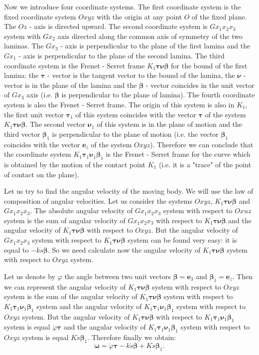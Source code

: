 \documentclass[10pt]{enoc2011}
\renewcommand{\vec}[1]{\boldsymbol{#1}}
\begin{document}
Now we introduce four coordinate systems. The first coordinate system is the fixed coordinate system $Oxyz$ with the origin at any point $O$ of the fixed plane. The $Oz$ - axis is directed upward. The second coordinate system is $Gx_1x_2x_3$ system with $Gx_2$ axis directed along the common axis of symmetry of the two laminas. The $Gx_3$ - axis  is perpendicular to the plane of the first lamina and the $Gx_1$ - axis is perpendicular to the plane of the second lamina. The third coordinate system is the Frenet - Serret frame $K_1\vec\tau\vec\nu\vec\beta$ for the bound of the first lamina: the $\vec\tau$ - vector is the tangent vector to the bound of the lamina, the $\vec\nu$ - vector is in the plane of the lamina and the $\vec\beta$ - vector coincides in the unit vector of $Gx_3$ axis (i.e. $\vec\beta$ is perpendicular to the plane of lamina). The fourth coordinate system is also the Frenet - Serret frame. The origin of this system is also in $K_1$, the first unit vector $\vec\tau_1$ of this system coincides with the vector $\vec\tau$ of the system $K_1\vec\tau\vec\nu\vec\beta$. The second vector $\vec\nu_1$ of this system is in the plane of motion and the third vector $\vec\beta_1$ is perpendicular to the plane of motion (i.e. the vector $\vec\beta_1$ coincides with the vector $\vec e_z$ of the system $Oxyz$). Therefore we can conclude that the coordinate system $K_1\vec\tau_1\vec\nu_1\vec\beta_1$ is the Frenet - Serret frame for the curve which is obtained by the motion of the contact point $K_1$ (i.e. it is a "trace" of the point of contact on the plane).

Let us try to find the angular velocity of the moving body. We will use the law of composition of angular velocities. Let us consider the systems $Oxyz$, $K_1\vec\tau\vec\nu\vec\beta$ and $Gx_1x_2x_3$. The absolute angular velocity of $Gx_1x_2x_3$ system with respect to $Oxuz$ system is the sum of angular velocity of $Gx_1x_2x_3$ with respect to $K_1\vec\tau\vec\nu\vec\beta$ and the angular velocity of $K_1\vec\tau\vec\nu\vec\beta$ with respect to $Oxyz$. But the angular velocity of $Gx_1x_2x_3$ system with respect to $K_1\vec\tau\vec\nu\vec\beta$ system can be found very easy: it is equal to $-k\dot{s}\vec\beta$. So we need calculate now the angular velocity of $K_1\vec\tau\vec\nu\vec\beta$ system with respect to $Oxyz$ system.

Let us denote by $\varphi$ the angle between two unit vectors $\vec\beta=\vec e_3$ and $\vec\beta_1=\vec e_z$. Then we can represent the angular velocity of $K_1\vec\tau\vec\nu\vec\beta$ system with respect to $Oxyz$ system is the sum of the angular velocity of $K_1\vec\tau\vec\nu\vec\beta$ system with respect to $K_1\vec\tau_1\vec\nu_1\vec\beta_1$ system and the angular velocity of $K_1\vec\tau_1\vec\nu_1\vec\beta_1$ system with respect to $Oxyz$ system. But the angular velocity of $K_1\vec\tau\vec\nu\vec\beta$ with respect to $K_1\vec\tau_1\vec\nu_1\vec\beta_1$ system is equal $\dot{\varphi}\vec\tau$ and the angular velocity of $K_1\vec\tau_1\vec\nu_1\vec\beta_1$ system with respect to $Oxyz$ system is equal $K\dot{s}\vec\beta_1$. Therefore finally we obtain:
$$
\vec\omega=\dot{\varphi}\vec\tau-k\dot{s}\vec\beta+K\dot{s}\vec\beta_1.
$$
\end{document}
